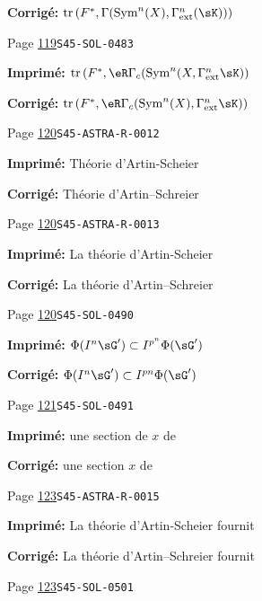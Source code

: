\documentclass[oneside]{book}
\DeclareMathOperator{\tr}{tr}
\theoremstyle{sga-source}
\theoremstyle{sga-source-dash}
\theoremstyle{sga-source-dotdash}
\theoremstyle{sga-source-number-note-dash}
\theoremstyle{sga-source-note-number-dotdash}
\theoremstyle{sga-source-example-dotdash}
\theoremstyle{sga-source-inline-number}
\theoremstyle{sga-source-bare-number}
\theoremstyle{sga-source}
\begin{document}
\begin{description}
\par\noindent\textbf{Corrigé:} \(\tr\left(F^*,\Gamma(\operatorname{Sym}^n(X),\Gamma_\text{ext}^n(\sK))\right)\)
\smallskip
\item[\hypertarget{apparatus:FR-0077}{77}] Page \hyperlink{printpage:fr:119}{119}\quad\texttt{S45-SOL-0483}
\par\noindent\textbf{Imprimé:} \(\tr\left(F^*,\eR\Gamma_c(\operatorname{Sym}^n(X,\Gamma_\text{ext}^n \sK)\right)\)
\par\noindent\textbf{Corrigé:} \(\tr\left(F^*,\eR\Gamma_c(\operatorname{Sym}^n(X),\Gamma_\text{ext}^n \sK)\right)\)
\smallskip
\item[\hypertarget{apparatus:FR-0078}{78}] Page \hyperlink{printpage:fr:120}{120}\quad\texttt{S45-ASTRA-R-0012}
\par\noindent\textbf{Imprimé:} Théorie d'Artin-Scheier
\par\noindent\textbf{Corrigé:} Théorie d'Artin--Schreier
\smallskip
\item[\hypertarget{apparatus:FR-0079}{79}] Page \hyperlink{printpage:fr:120}{120}\quad\texttt{S45-ASTRA-R-0013}
\par\noindent\textbf{Imprimé:} La théorie d'Artin-Scheier
\par\noindent\textbf{Corrigé:} La théorie d'Artin--Schreier
\smallskip
\item[\hypertarget{apparatus:FR-0080}{80}] Page \hyperlink{printpage:fr:120}{120}\quad\texttt{S45-SOL-0490}
\par\noindent\textbf{Imprimé:} \(\Phi(I^n \sG')\subset I^{p^n}\Phi(\sG')\)
\par\noindent\textbf{Corrigé:} \(\Phi(I^n \sG')\subset I^{p n}\Phi(\sG')\)
\smallskip
\item[\hypertarget{apparatus:FR-0081}{81}] Page \hyperlink{printpage:fr:121}{121}\quad\texttt{S45-SOL-0491}
\par\noindent\textbf{Imprimé:} une section de $x$ de
\par\noindent\textbf{Corrigé:} une section $x$ de
\smallskip
\item[\hypertarget{apparatus:FR-0082}{82}] Page \hyperlink{printpage:fr:123}{123}\quad\texttt{S45-ASTRA-R-0015}
\par\noindent\textbf{Imprimé:} La théorie d'Artin-Scheier fournit
\par\noindent\textbf{Corrigé:} La théorie d'Artin--Schreier fournit
\smallskip
\item[\hypertarget{apparatus:FR-0083}{83}] Page \hyperlink{printpage:fr:123}{123}\quad\texttt{S45-SOL-0501}

\end{description}
\end{document}
